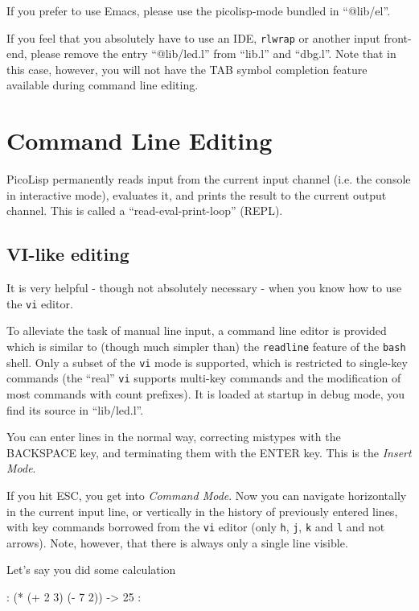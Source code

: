 If you prefer to use Emacs, please use the picolisp-mode bundled in
``@lib/el''.

If you feel that you absolutely have to use an IDE, \texttt{rlwrap} or
another input front-end, please remove the entry ``@lib/led.l'' from
``lib.l'' and ``dbg.l''. Note that in this case, however, you will not
have the TAB symbol completion feature available during command line
editing.

\section{Command Line Editing}
\label{sec:tut-command-line-editing}

PicoLisp permanently reads input from the current input channel (i.e.
the console in interactive mode), evaluates it, and prints the result to
the current output channel. This is called a ``read-eval-print-loop''
(REPL).

\subsection{VI-like editing}
\label{sec:tut-vi-like-editing}


It is very helpful - though not absolutely necessary - when you know how
to use the \texttt{vi} editor.

To alleviate the task of manual line input, a command line editor is
provided which is similar to (though much simpler than) the \texttt{readline}
feature of the \texttt{bash} shell. Only a subset of the \texttt{vi} mode is
supported, which is restricted to single-key commands (the ``real'' \texttt{vi}
supports multi-key commands and the modification of most commands with
count prefixes). It is loaded at startup in debug mode, you find its
source in ``lib/led.l''.

You can enter lines in the normal way, correcting mistypes with the
BACKSPACE key, and terminating them with the ENTER key. This is the
\emph{Insert Mode}.

If you hit ESC, you get into \emph{Command Mode}. Now you can navigate
horizontally in the current input line, or vertically in the history of
previously entered lines, with key commands borrowed from the \texttt{vi}
editor (only \texttt{h}, \texttt{j}, \texttt{k} and \texttt{l} and not arrows). Note, however, that
there is always only a single line visible.

Let's say you did some calculation


\begin{wideverbatim}
: (* (+ 2 3) (- 7 2))
-> 25
:
\end{wideverbatim}

